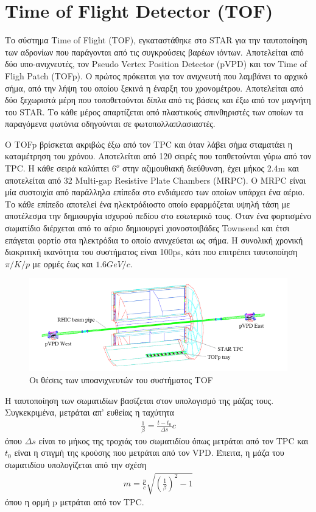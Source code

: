 \section{Time of Flight Detector (TOF)}

	Το σύστημα Time of Flight (TOF), εγκαταστάθηκε στο STAR για την ταυτοποίηση των αδρονίων που παράγονται από τις συγκρούσεις βαρέων ιόντων. Αποτελείται από δύο υπο-ανιχνευτές, τον Pseudo Vertex Position Detector (pVPD) και τον Time of Fligh Patch (TOFp). 
	Ο πρώτος πρόκειται για τον ανιχνευτή που λαμβάνει το αρχικό σήμα, από την λήψη του οποίου ξεκινά η έναρξη του χρονομέτρου. Αποτελείται από δύο ξεχωριστά μέρη που τοποθετούνται δίπλα από τις βάσεις και έξω από τον μαγνήτη του STAR.
	Το κάθε μέρος απαρτίζεται από πλαστικούς σπινθηριστές των οποίων τα παραγόμενα φωτόνια οδηγούνται σε φωτοπολλαπλασιαστές.
	
	Ο TOFp βρίσκεται ακριβώς έξω από τον TPC και όταν λάβει σήμα σταματάει η καταμέτρηση του χρόνου. Αποτελείται από 120 σειρές που τοπθετούνται γύρω από τον TPC. Η κάθε σειρά καλύπτει $6^o$ στην αζιμουθιακή διεύθυνση, έχει μήκος 2.4m και αποτελείται από 32 Multi-gap Resistive Plate Chambers (MRPC). 
	Ο MRPC  είναι μία συστοιχία από παράλληλα επίπεδα στο ενδιάμεσο των οποίων υπάρχει ένα αέριο.
	 Το κάθε επίπεδο αποτελεί ένα ηλεκτρόδιοστο οποίο εφαρμόζεται υψηλή τάση με αποτέλεσμα την δημιουργία ισχυρού πεδίου στο εσωτερικό τους. Όταν ένα φορτισμένο σωματίδιο διέρχεται από το αέριο δημιουργεί χιονοστοιβάδες Townsend και έτσι επάγεται φορτίο στα ηλεκτρόδια το οποίο ανινχεύεται ως σήμα.
	Η συνολική χρονική διακριτική ικανότητα του συστήματος είναι 100ps, κάτι που επιτρέπει ταυτοποίηση $\pi/K/p$ με ορμές έως και $1.6GeV/c$.
	
		\begin{figure}[h!]
				\centering
				\includegraphics[scale=0.6]{STAR_Detectors/TOF}
				\caption{Οι θέσεις των υποανιχνευτών του συστήματος TOF}
				\label{fig3.27}
			\end{figure}
				
	
	Η ταυτοποίηση των σωματιδίων βασίζεται στον υπολογισμό της μάζας τους. Συγκεκριμένα, μετράται απ' ευθείας η ταχύτητα 
		\begin{align}\label{eq3.14}
			\frac{1}{\beta} = \frac{t-t_0}{\Delta s}c
		\end{align}
	όπου $\Delta s$ είναι το μήκος της τροχιάς του σωματιδίου όπως μετράται από τον TPC και $t_0$ είναι η στιγμή της κρούσης που μετράται από τον VPD. Έπειτα, η μάζα του σωματιδίου υπολογίζεται από την σχέση 
		\begin{align}\label{eq3.15}
			m = \frac{p}{c}\sqrt{\left(\frac{1}{\beta}\right)^2-1}
		\end{align}
	όπου η ορμή p μετράται από τον TPC.